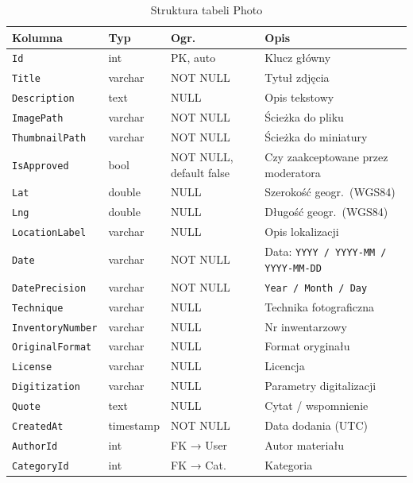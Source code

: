 \documentclass[12pt, a4paper]{article}
\begin{document}
\begin{table}[H]
  \centering
  \caption{Struktura tabeli Photo}
  \begin{tabular}{@{}L{3.8cm}L{2.2cm}L{2.3cm}L{5cm}@{}}
    \toprule
    \textbf{Kolumna} & \textbf{Typ} & \textbf{Ogr.} & \textbf{Opis} \\
    \midrule
    \texttt{Id}              & int       & PK, auto  & Klucz główny \\
    \texttt{Title}           & varchar   & NOT NULL  & Tytuł zdjęcia \\
    \texttt{Description}     & text      & NULL      & Opis tekstowy \\
    \texttt{ImagePath}       & varchar   & NOT NULL  & Ścieżka do pliku \\
    \texttt{ThumbnailPath}   & varchar   & NOT NULL  & Ścieżka do miniatury \\
    \texttt{IsApproved}      & bool      & NOT NULL, default false & Czy zaakceptowane przez moderatora \\
    \texttt{Lat}             & double    & NULL      & Szerokość geogr.\ (WGS84) \\
    \texttt{Lng}             & double    & NULL      & Długość geogr.\ (WGS84) \\
    \texttt{LocationLabel}   & varchar   & NULL      & Opis lokalizacji \\
    \texttt{Date}            & varchar   & NOT NULL  & Data: \texttt{YYYY / YYYY-MM / YYYY-MM-DD} \\
    \texttt{DatePrecision}   & varchar   & NOT NULL  & \texttt{Year / Month / Day} \\
    \texttt{Technique}       & varchar   & NULL      & Technika fotograficzna \\
    \texttt{InventoryNumber} & varchar   & NULL      & Nr inwentarzowy \\
    \texttt{OriginalFormat}  & varchar   & NULL      & Format oryginału \\
    \texttt{License}         & varchar   & NULL      & Licencja \\
    \texttt{Digitization}    & varchar   & NULL      & Parametry digitalizacji \\
    \texttt{Quote}           & text      & NULL      & Cytat / wspomnienie \\
    \texttt{CreatedAt}       & timestamp & NOT NULL  & Data dodania (UTC) \\
    \texttt{AuthorId}        & int       & FK → User & Autor materiału \\
    \texttt{CategoryId}      & int       & FK → Cat. & Kategoria \\
    \bottomrule
  \end{tabular}
\end{table}
\end{document}
